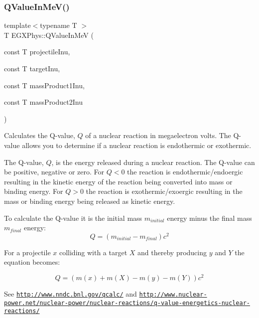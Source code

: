 \mbox{\label{group___e_g_x_phys-_q_value_ga53f07ac44d3d3b217b8c5b7aa548e3fc}} 
\subsubsection{\texorpdfstring{Q\+Value\+In\+Me\+V()}{QValueInMeV()}}
{\footnotesize\ttfamily template$<$typename T $>$ \\
T E\+G\+X\+Phys\+::\+Q\+Value\+In\+MeV (\begin{DoxyParamCaption}\item[{const T}]{projectile\+Inu,  }\item[{const T}]{target\+Inu,  }\item[{const T}]{mass\+Product1\+Inu,  }\item[{const T}]{mass\+Product2\+Inu }\end{DoxyParamCaption})}



Calculates the Q-\/value, $Q$ of a nuclear reaction in megaelectron volts. The Q-\/value allows you to determine if a nuclear reaction is endothermic or exothermic. 

The Q-\/value, $Q$, is the energy released during a nuclear reaction. The Q-\/value can be positive, negative or zero. For $Q < 0$ the reaction is endothermic/endoergic resulting in the kinetic energy of the reaction being converted into mass or binding energy. For $Q > 0$ the reaction is exothermic/exoergic resulting in the mass or binding energy being released as kinetic energy.

To calculate the Q-\/value it is the initial mass $m_{initial}$ energy minus the final mass $m_{final}$ energy\+: \[Q = \left ( m_{initial}-m_{final}\right ) c^2\]

For a projectile $x$ colliding with a target $X$ and thereby producing $y$ and $Y$ the equation becomes\+:

\[Q = \left ( m(x) + m (X) - m(y) - m(Y) \right ) c^2\]

See \href{http://www.nndc.bnl.gov/qcalc/}{\tt http\+://www.\+nndc.\+bnl.\+gov/qcalc/} and \href{http://www.nuclear-power.net/nuclear-power/nuclear-reactions/q-value-energetics-nuclear-reactions/}{\tt http\+://www.\+nuclear-\/power.\+net/nuclear-\/power/nuclear-\/reactions/q-\/value-\/energetics-\/nuclear-\/reactions/}

